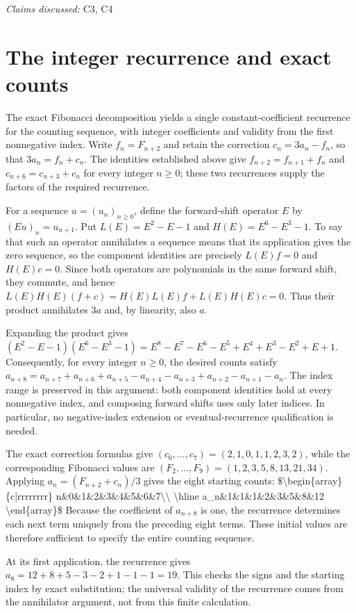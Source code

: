 \documentclass[11pt]{article}
\begin{document}
\textit{Claims discussed: }C3, C4
\section{The integer recurrence and exact counts}
The exact Fibonacci decomposition yields a single constant-coefficient recurrence for the counting sequence, with integer coefficients and validity from the first nonnegative index. Write $f_n=F_{n+2}$ and retain the correction $c_n=3a_n-f_n$, so that $3a_n=f_n+c_n$. The identities established above give $f_{n+2}=f_{n+1}+f_n$ and $c_{n+6}=c_{n+3}+c_n$ for every integer $n\geq 0$; these two recurrences supply the factors of the required recurrence.

For a sequence $u=(u_n)_{n\geq 0}$, define the forward-shift operator $E$ by $(Eu)_n=u_{n+1}$. Put $L(E)=E^2-E-1$ and $H(E)=E^6-E^3-1$. To say that such an operator annihilates a sequence means that its application gives the zero sequence, so the component identities are precisely $L(E)f=0$ and $H(E)c=0$. Since both operators are polynomials in the same forward shift, they commute, and hence
$L(E)H(E)(f+c)=H(E)L(E)f+L(E)H(E)c=0.$
Thus their product annihilates $3a$ and, by linearity, also $a$.

Expanding the product gives
$(E^2-E-1)(E^6-E^3-1)=E^8-E^7-E^6-E^5+E^4+E^3-E^2+E+1.$
Consequently, for every integer $n\geq 0$, the desired counts satisfy
$a_{n+8}=a_{n+7}+a_{n+6}+a_{n+5}-a_{n+4}-a_{n+3}+a_{n+2}-a_{n+1}-a_n.$
The index range is preserved in this argument: both component identities hold at every nonnegative index, and composing forward shifts uses only later indices. In particular, no negative-index extension or eventual-recurrence qualification is needed.

The exact correction formulas give $(c_0,\ldots,c_7)=(2,1,0,1,1,2,3,2)$, while the corresponding Fibonacci values are $(F_2,\ldots,F_9)=(1,2,3,5,8,13,21,34)$. Applying $a_n=(F_{n+2}+c_n)/3$ gives the eight starting counts:
\$\textbackslash{}begin\{array\}\{c|rrrrrrrr\} n\&0\&1\&2\&3\&4\&5\&6\&7\textbackslash{}\textbackslash{} \textbackslash{}hline a\_n\&1\&1\&1\&2\&3\&5\&8\&12 \textbackslash{}end\{array\}\$
Because the coefficient of $a_{n+8}$ is one, the recurrence determines each next term uniquely from the preceding eight terms. These initial values are therefore sufficient to specify the entire counting sequence.

At its first application, the recurrence gives
$a_8=12+8+5-3-2+1-1-1=19.$
This checks the signs and the starting index by exact substitution; the universal validity of the recurrence comes from the annihilator argument, not from this finite calculation.
\end{document}
